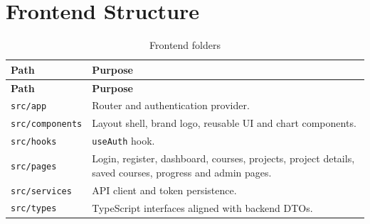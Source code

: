 \documentclass[12pt,a4paper]{report}
\begin{document}
\section{Frontend Structure}
\begin{longtable}{p{}p{}}
\caption{Frontend folders}\\
\toprule
\textbf{Path} & \textbf{Purpose}\\
\midrule
\endfirsthead
\toprule
\textbf{Path} & \textbf{Purpose}\\
\midrule
\endhead
\texttt{src/app} & Router and authentication provider.\\
\texttt{src/components} & Layout shell, brand logo, reusable UI and chart components.\\
\texttt{src/hooks} & \texttt{useAuth} hook.\\
\texttt{src/pages} & Login, register, dashboard, courses, projects, project details, saved courses, progress and admin pages.\\
\texttt{src/services} & API client and token persistence.\\
\texttt{src/types} & TypeScript interfaces aligned with backend DTOs.\\
\bottomrule
\end{longtable}
\end{document}
